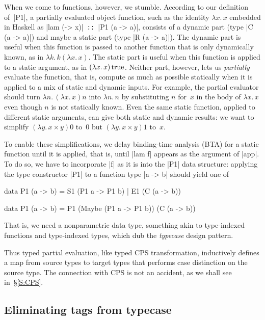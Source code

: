 \documentclass[preprint]{sigplanconf}
\newcommand{\fun}[1]{\mathopen{\lambda\mathord{#1}.\,}}
\newcommand{\True}{\mathinner{\mathrm{true}}}
\begin{document}
When we come to functions, however, we stumble.  According to our
definition of~|P1|, a partially evaluated object function, such as the
identity $\fun{x}x$ embedded in Haskell as |lam (\x -> x)|\texttt{ ::
}|P1 (a -> a)|, consists of a dynamic part (type |C (a -> a)|) and
maybe a static part (type |R (a -> a)|).  The dynamic part is useful
when this function is passed to another function that is only
dynamically known, as in $\fun{k}k(\fun{x}x)$.  The static part is
useful when this function is applied to a static argument, as in
$(\fun{x}x)\True$.  Neither part, however, lets us \emph{partially}
evaluate the function, that is, compute as much as possible statically
when it is applied to a mix of static and dynamic inputs.  For example,
the partial evaluator should turn $\fun{n}(\fun{x}x)n$ into $\fun{n}n$
by substituting $n$ for~$x$ in the body of $\fun{x}x$ even though $n$ is
not statically known.  Even the same static function, applied to
different static arguments, can give both static and dynamic results: we
want to simplify $(\fun{y}x\times y)0$ to~$0$ but $(\fun{y}x\times y)1$
to~$x$.

To enable these simplifications, we delay binding-time analysis (BTA)
for a static function until it is applied, that is, until |lam f|
appears as the argument of |app|.  To do so, we have to incorporate |f|
as it is into the |P1| data structure: applying the type constructor
|P1| to a function type |a -> b| should yield one of
\begin{code}
data P1 (a -> b) = S1 (P1 a -> P1 b)
                 | E1 (C (a -> b))

data P1 (a -> b) = P1 (Maybe (P1 a -> P1 b))
                      (C (a -> b))
\end{code}
That is, we need a nonparametric data type, something akin to
type-indexed functions and type-indexed types, which
\citet{oliveira-typecase} dub the \emph{typecase} design pattern.

Thus typed partial evaluation, like typed CPS transformation,
inductively defines a map from source types to target types that
performs case distinction on the source type.  The connection with CPS
is not an accident, as we shall see in~\S\ref{S:CPS}.

\subsection{Eliminating tags from typecase}
\label{S:PE-GADT}
\end{document}
